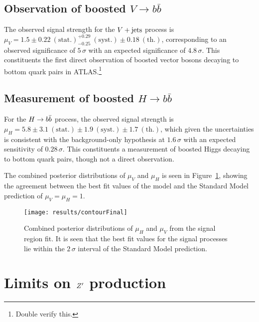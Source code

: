 \subsection{Observation of boosted $V\to b\bar{b}$}

The observed signal strength for the $V + \text{jets}$ process is\\ $\mu_{V} = 1.5 \pm 0.22~\mathrm{(stat.)}^{+0.29}_{-0.25}~\mathrm{(syst.)} \pm 0.18~\mathrm{(th.)}$, corresponding to an observed significance of $5\,\sigma$ with an expected significance of $4.8\,\sigma$.
This constituents the first direct observation of boosted vector bosons decaying to bottom quark pairs in ATLAS.\footnote{\TODO{} Double verify this.}

\subsection{Measurement of boosted $H\to b\bar{b}$}
For the $H \to b\bar{b}$ process, the observed signal strength is\\ $\mu_{H} = 5.8 \pm 3.1~\mathrm{(stat.)} \pm 1.9~\mathrm{(syst.)} \pm 1.7~\mathrm{(th.)}$, which given the uncertainties is consistent with the background-only hypothesis at $1.6\,\sigma$ with an expected sensitivity of $0.28\,\sigma$.
This constituents a measurement of boosted Higgs decaying to bottom quark pairs, though not a direct observation.

The combined posterior distributions of $\mu_{V}$ and $\mu_{H}$ is seen in Figure~\ref{fig:signal_strength_contour}, showing the agreement between the best fit values of the model and the Standard Model prediction of $\mu_{V} = \mu_{H} = 1$.

\begin{figure}[htbp]
 \centering
 \texttt{[image: results/contourFinal]}
 \caption{Combined posterior distributions of $\mu_{H}$ and $\mu_{V}$ from the signal region fit.
  It is seen that the best fit values for the signal processes lie within the $2\,\sigma$ interval of the Standard Model prediction.}
 \label{fig:signal_strength_contour}
\end{figure}

\section{Limits on $Z'$ production}

